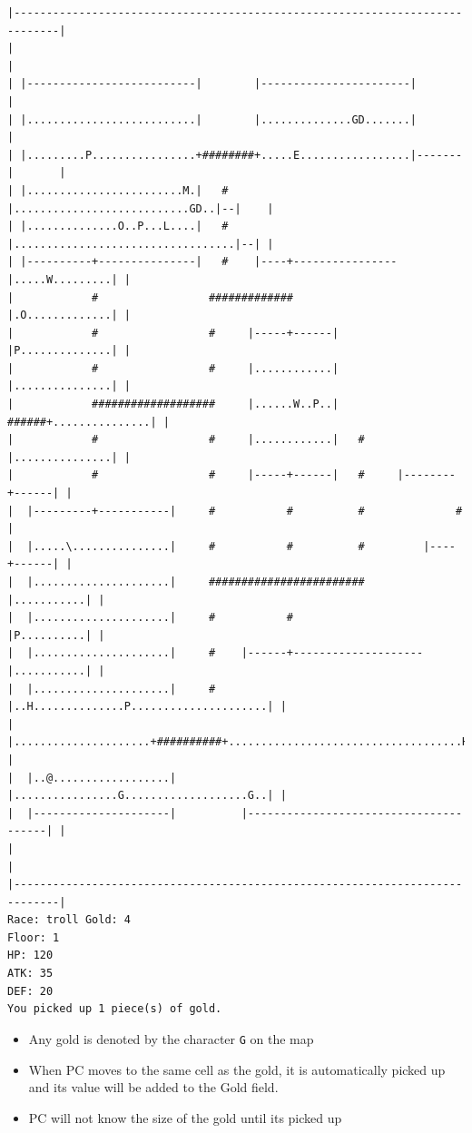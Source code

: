 \documentclass[11pt]{article}
\theoremstyle{plain}
\begin{document}
\begin{Verbatim}[fontsize=\scriptsize]
|-----------------------------------------------------------------------------|
|                                                                             |
| |--------------------------|        |-----------------------|               |
| |..........................|        |..............GD.......|               |
| |.........P................+########+.....E.................|-------|       |
| |........................M.|   #    |...........................GD..|--|    |
| |..............O..P...L....|   #    |..................................|--| |
| |----------+---------------|   #    |----+----------------|.....W.........| |
|            #                 #############                |.O.............| |
|            #                 #     |-----+------|         |P..............| |
|            #                 #     |............|         |...............| |
|            ###################     |......W..P..|   ######+...............| |
|            #                 #     |............|   #     |...............| |
|            #                 #     |-----+------|   #     |--------+------| |
|  |---------+-----------|     #           #          #              #        |
|  |.....\...............|     #           #          #         |----+------| |
|  |.....................|     ########################         |...........| |
|  |.....................|     #           #                    |P..........| |
|  |.....................|     #    |------+--------------------|...........| |
|  |.....................|     #    |..H..............P.....................| |
|  |.....................+##########+....................................H..| |
|  |..@..................|          |................G...................G..| |
|  |---------------------|          |---------------------------------------| |
|                                                                             |
|-----------------------------------------------------------------------------|
Race: troll Gold: 4                                                    Floor: 1
HP: 120
ATK: 35
DEF: 20
You picked up 1 piece(s) of gold. 
\end{Verbatim}

\begin{itemize}
    \item Any gold is denoted by the character \texttt{G} on the map
    \item When PC moves to the same cell as the gold, it is automatically picked up
          and its value will be added to the Gold field.
    \item PC will not know the size of the gold until its picked up
\end{itemize}
\end{document}
